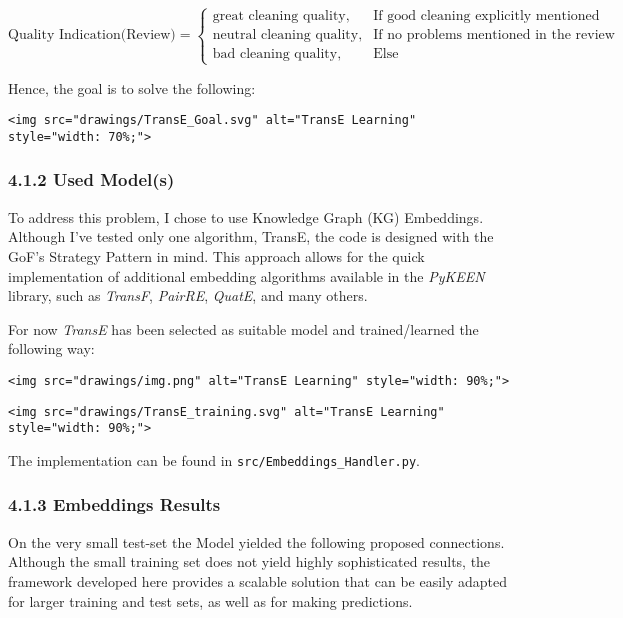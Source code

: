 \[
\text{Quality Indication(Review)} = 
\begin{cases}
\text{great cleaning quality}, & \text{If good cleaning explicitly mentioned }  \\
\text{neutral cleaning quality}, & \text{If no problems mentioned in the review }  \\ 
\text{bad cleaning quality}, & \text{Else }
\end{cases}
\]

Hence, the goal is to solve the following:

\begin{verbatim}
<img src="drawings/TransE_Goal.svg" alt="TransE Learning" style="width: 70%;">
\end{verbatim}

\subsubsection{4.1.2 Used Model(s)}\label{used-models}

To address this problem, I chose to use Knowledge Graph (KG) Embeddings.
Although I've tested only one algorithm, TransE, the code is designed
with the GoF's Strategy Pattern in mind. This approach allows for the
quick implementation of additional embedding algorithms available in the
\emph{PyKEEN} library, such as \emph{TransF}, \emph{PairRE},
\emph{QuatE}, and many others.

For now \emph{TransE} has been selected as suitable model and
trained/learned the following way:

\begin{verbatim}
<img src="drawings/img.png" alt="TransE Learning" style="width: 90%;">
\end{verbatim}

\begin{verbatim}
<img src="drawings/TransE_training.svg" alt="TransE Learning" style="width: 90%;">
\end{verbatim}

The implementation can be found in \texttt{src/Embeddings\_Handler.py}.

\subsubsection{4.1.3 Embeddings Results}\label{embeddings-results}

On the very small test-set the Model yielded the following proposed
connections. Although the small training set does not yield highly
sophisticated results, the framework developed here provides a scalable
solution that can be easily adapted for larger training and test sets,
as well as for making predictions.

